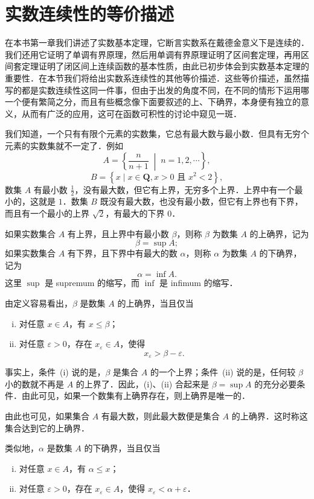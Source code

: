 \section{实数连续性的等价描述}

在本书第一章我们讲述了实数基本定理，它断言实数系在戴德金意义下是连续的．我们还用它证明了单调有界原理，然后用单调有界原理证明了区间套定理，再用区间套定理证明了闭区间上连续函数的基本性质，由此已初步体会到实数基本定理的重要性．在本节我们将给出实数系连续性的其他等价描述．这些等价描述，虽然描写的都是实数连续性这同一件事，但由于出发的角度不同，在不同的情形下运用哪一个便有繁简之分，而且有些概念像下面要叙述的上、下确界，本身便有独立的意义，从而有广泛的应用，这可在函数可积性的讨论中窥见一斑．

我们知道，一个只有有限个元素的实数集，它总有最大数与最小数．但具有无穷个元素的实数集就不一定了．例如
\[
A = \left\{ \frac{n}{n+1} \;\middle|\; n = 1, 2, \cdots \right\},
\]
\[
B = \left\{ x \mid x \in \mathbf{Q}, x > 0 \text{ 且 } x^2 < 2 \right\},
\]
数集 $A$ 有最小数 $\frac{1}{2}$，没有最大数，但它有上界，无穷多个上界．上界中有一个最小的，这就是 $1$．数集 $B$ 既没有最大数，也没有最小数，但它有上界也有下界，而且有一个最小的上界 $\sqrt{2}$，有最大的下界 $0$．

\begin{definition}\label{def:9.1}
如果实数集合 $A$ 有上界，且上界中有最小数 $\beta$，则称 $\beta$ 为数集 $A$ 的上确界，记为
\[
\beta = \sup A;
\]
如果实数集合 $A$ 有下界，且下界中有最大的数 $\alpha$，则称 $\alpha$ 为数集 $A$ 的下确界，记为
\[
\alpha = \inf A.
\]
这里 $\sup$ 是 supremum 的缩写，而 $\inf$ 是 infimum 的缩写．
\end{definition}

由定义容易看出，$\beta$ 是数集 $A$ 的上确界，当且仅当
\begin{enumerate}[(i)]
\item 对任意 $x \in A$，有 $x \leqslant \beta$；
\item 对任意 $\varepsilon > 0$，存在 $x_{\varepsilon} \in A$，使得
\[
x_{\varepsilon} > \beta - \varepsilon.
\]
\end{enumerate}
事实上，条件~(i) 说的是，$\beta$ 是集合 $A$ 的一个上界；条件~(ii) 说的是，任何较 $\beta$ 小的数就不再是 $A$ 的上界了．因此，(i)、(ii) 合起来是 $\beta = \sup A$ 的充分必要条件．由此可见，如果一个数集有上确界存在，则上确界是唯一的．

由此也可见，如果集合 $A$ 有最大数，则此最大数便是集合 $A$ 的上确界．这时称这集合达到它的上确界．

类似地，$\alpha$ 是数集 $A$ 的下确界，当且仅当
\begin{enumerate}[(i)]
\item 对任意 $x \in A$，有 $\alpha \leqslant x$；
\item 对任意 $\varepsilon > 0$，存在 $x_{\varepsilon} \in A$，使得 $x_{\varepsilon} < \alpha + \varepsilon$．
\end{enumerate}


